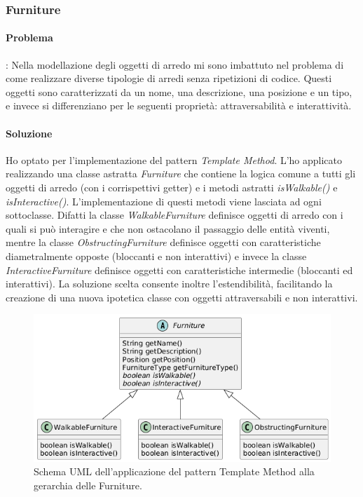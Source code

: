 \documentclass[a4paper,12pt]{report}
\begin{document}
\subsubsection{Furniture}
\paragraph{Problema}: Nella modellazione degli oggetti di arredo mi sono imbattuto nel problema 
di come realizzare diverse tipologie di arredi senza ripetizioni di codice. Questi oggetti 
sono caratterizzati da un nome, una descrizione, una posizione e un tipo, e invece si differenziano 
per le seguenti proprietà: attraversabilità e interattività.
\paragraph{Soluzione} Ho optato per l'implementazione del pattern \textit{Template Method}. 
L'ho applicato realizzando una classe astratta \textit{Furniture} che contiene la logica comune a 
tutti gli oggetti di arredo (con i corrispettivi getter) e i metodi astratti \textit{isWalkable()} e 
\textit{isInteractive()}. L'implementazione di questi metodi viene lasciata ad ogni sottoclasse.
Difatti la classe \textit{WalkableFurniture} definisce oggetti di arredo con i quali si può interagire e
che non ostacolano il passaggio delle entità viventi, mentre la classe \textit{ObstructingFurniture} 
definisce oggetti con caratteristiche diametralmente opposte (bloccanti e non interattivi) e 
invece la classe \textit{InteractiveFurniture} definisce oggetti con caratteristiche intermedie (bloccanti ed interattivi).
\newline La soluzione scelta consente inoltre l'estendibilità, facilitando la creazione di una nuova
ipotetica classe con oggetti attraversabili e non interattivi.

\begin{figure}[H]
	\centering{}
	\includegraphics[width=\textwidth]{img/template.png}
	\caption{Schema UML dell'applicazione del pattern Template Method alla gerarchia delle Furniture.}
	\label{img:template}
\end{figure}
\end{document}
